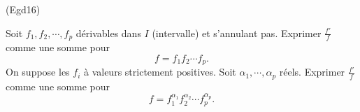 \begin{tiny}(Egd16)\end{tiny} Soit $f_1, f_2, \cdots, f_p$ dérivables dans $I$ (intervalle) et s'annulant pas. Exprimer $\frac{f'}{f}$ comme une somme pour
\[
  f = f_1 f_2 \cdots f_p. 
\]
On suppose les $f_i$ à valeurs strictement positives. Soit $\alpha_1, \cdots, \alpha_p$ réels. Exprimer $\frac{f'}{f}$ comme une somme pour
\[
  f = f_1^{\alpha_1} f_2^{\alpha_2} \cdots f_p^{\alpha_p}. 
\]
